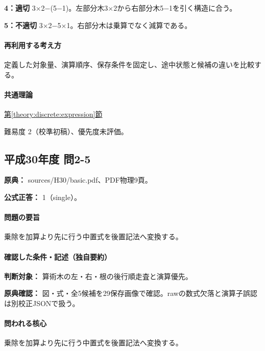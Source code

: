 \noindent\textbf{4：適切} 3×2−(5−1)。左部分木3×2から右部分木5−1を引く構造に合う。\par

\noindent\textbf{5：不適切} 3×2−5×1。右部分木は乗算でなく減算である。\par

\paragraph{再利用する考え方} 定義した対象量、演算順序、保存条件を固定し、途中状態と候補の違いを比較する。

\paragraph{共通理論} \hyperref[theory:discrete:expression]{第\ref*{theory:discrete:expression}節}

\par 難易度 2（校準初稿）、優先度未評価。

\subsection{平成30年度 問2-5}
\label{q:h30-reg-basic-2-5}

\noindent\textbf{原典：} sources/H30/basic.pdf、PDF物理9頁。

\textbf{公式正答：} 1（single）。

\paragraph{問題の要旨} 乗除を加算より先に行う中置式を後置記法へ変換する。

\paragraph{確認した条件・記述（独自要約）}\mbox{}\par

\noindent\textbf{判断対象：} 算術木の左・右・根の後行順走査と演算優先。\par

\noindent\textbf{原典確認：} 図・式・全5候補を29保存画像で確認。rawの数式欠落と演算子誤認は別校正JSONで扱う。\par

\paragraph{問われる核心} 乗除を加算より先に行う中置式を後置記法へ変換する。

